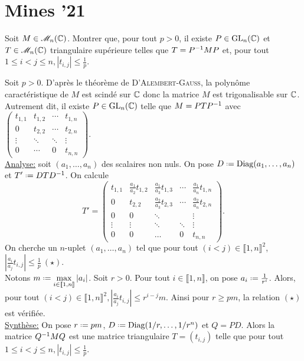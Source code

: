 \section{Mines '21}
\begin{exercice}
    Soit $M \in \mathscr{M}_n(\mathbb{C})$. Montrer que, pour tout $p > 0$, il existe $P \in \mathrm{GL}_n(\mathbb{C})$ et $T \in \mathscr{M}_n(\mathbb{C})$ triangulaire supérieure telles que $T = P^{-1} M P$ et, pour tout $1 \leqslant i < j \leqslant n, |t_{i,j}| \leqslant \frac{1}{p}$.
\end{exercice}

\begin{solution}
    Soit $p > 0$. D'après le théorème de \textsc{D'Alembert}-\textsc{Gauss}, la polynôme caractéristique de $M$ est scindé sur $\mathbb{C}$ donc la matrice $M$ est trigonalisable sur $\mathbb{C}$. Autrement dit, il existe $P \in \mathrm{GL}_n(\mathbb{C})$ telle que $M = P T P^{-1}$ avec 
    $
    \begin{pmatrix}
        t_{1,1} & t_{1,2} & \cdots & t_{1,n} \\
        0 & t_{2,2} & \cdots & t_{2,n} \\
        \vdots & \ddots & \ddots & \vdots \\
        0 & \cdots & 0 & t_{n,n}
    \end{pmatrix}. 
    $ \\
    \underline{Analyse:} soit $(a_1, \dots, a_n)$ des scalaires non nuls. On pose $D \defeq \Diag(a_1, \dots, a_n)$ et $T' \defeq D T \Inv{D}$. On calcule
    $$T'=
    \begin{pmatrix}
        t_{1,1} & \frac{a_1}{a_2}t_{1,2} & \frac{a_1}{a_3} t_{1,3} & \cdots & \frac{a_1}{a_n} t_{1,n} \\
        0 & t_{2,2} & \frac{a_2}{a_3}t_{2,3} & \cdots & \frac{a_2}{a_n} t_{2,n} \\
        0 & 0 & \ddots & & \vdots \\
        \vdots & \vdots & \ddots & \ddots & \vdots \\
        0 & 0 & \dots & 0 & t_{n,n}
    \end{pmatrix}.
    $$
    On cherche un $n$-uplet $(a_1, \dots, a_n)$ tel que pour tout $(i < j) \in \llbracket 1, n \rrbracket^2$, $\left| \frac{a_i}{a_j}t_{i,j} \right| \leqslant \frac{1}{p} \ (\star)$. \\
    Notons $m \defeq \max\limits_{i \in \llbracket 1, n \rrbracket} |a_i|$.
    Soit $r > 0$. Pour tout $i \in \llbracket 1, n \rrbracket$, on pose $a_i \defeq \frac{1}{r^i}$. Alors, pour tout $(i < j) \in \llbracket 1, n \rrbracket^2, \left| \frac{a_i}{a_j} t_{i,j} \right| \leqslant r^{i-j}m$. Ainsi pour $r \geqslant pm$, la relation $(\star)$ est vérifiée. \\
    \underline{Synthèse:} On pose $r \defeq pm$, $D \defeq \Diag(1/r, \dots, 1/r^n)$ et $Q = PD$. Alors la matrice $Q^{-1} M Q$ est une matrice triangulaire $T = (t_{i,j})$ telle que pour tout $1 \leqslant i < j \leqslant n, |t_{i,j}| \leqslant \frac{1}{p}$.
\end{solution}

